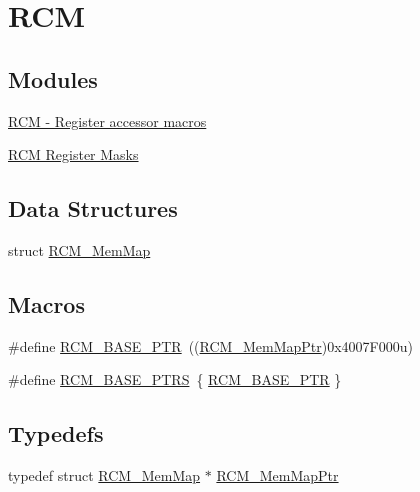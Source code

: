 \hypertarget{group___r_c_m___peripheral}{}\section{R\+C\+M}
\label{group___r_c_m___peripheral}
\subsection*{Modules}
\begin{DoxyCompactItemize}
\item 
\hyperlink{group___r_c_m___register___accessor___macros}{R\+C\+M -\/ Register accessor macros}
\item 
\hyperlink{group___r_c_m___register___masks}{R\+C\+M Register Masks}
\end{DoxyCompactItemize}
\subsection*{Data Structures}
\begin{DoxyCompactItemize}
\item 
struct \hyperlink{struct_r_c_m___mem_map}{R\+C\+M\+\_\+\+Mem\+Map}
\end{DoxyCompactItemize}
\subsection*{Macros}
\begin{DoxyCompactItemize}
\item 
\#define \hyperlink{group___r_c_m___peripheral_ga25ab3aa8d593d455ed36a52c77f88234}{R\+C\+M\+\_\+\+B\+A\+S\+E\+\_\+\+P\+T\+R}~((\hyperlink{group___r_c_m___peripheral_ga787b1c58d947f0b81c2502227dd0396b}{R\+C\+M\+\_\+\+Mem\+Map\+Ptr})0x4007\+F000u)
\item 
\#define \hyperlink{group___r_c_m___peripheral_gad8549fec4a09b0b485983beadfc3a5fb}{R\+C\+M\+\_\+\+B\+A\+S\+E\+\_\+\+P\+T\+R\+S}~\{ \hyperlink{group___r_c_m___peripheral_ga25ab3aa8d593d455ed36a52c77f88234}{R\+C\+M\+\_\+\+B\+A\+S\+E\+\_\+\+P\+T\+R} \}
\end{DoxyCompactItemize}
\subsection*{Typedefs}
\begin{DoxyCompactItemize}
\item 
typedef struct \hyperlink{struct_r_c_m___mem_map}{R\+C\+M\+\_\+\+Mem\+Map} $\ast$ \hyperlink{group___r_c_m___peripheral_ga787b1c58d947f0b81c2502227dd0396b}{R\+C\+M\+\_\+\+Mem\+Map\+Ptr}
\end{DoxyCompactItemize}


